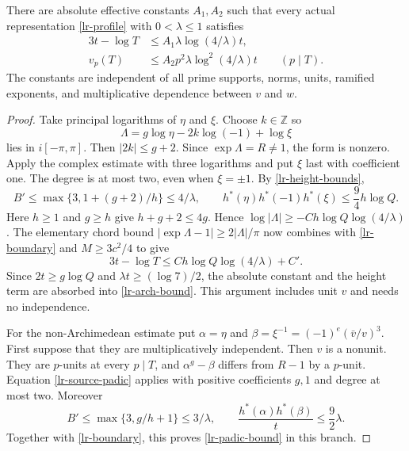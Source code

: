 \begin{theorem}\label{lr-two-place}
There are absolute effective constants $A_1,A_2$ such that every actual
representation \eqref{lr-profile} with $0<\lambda\le1$ satisfies
\begin{align}
 3t-\log T&\le A_1\lambda\log(4/\lambda)t,
      \label{lr-arch-bound}\\
 v_p(T)&\le A_2p^2\lambda\log^2(4/\lambda)t
      \qquad(p\mid T).\label{lr-padic-bound}
\end{align}
The constants are independent of all prime supports, norms, units,
ramified exponents, and multiplicative dependence between $v$ and $w$.
\end{theorem}
\begin{proof}
Take principal logarithms of $\eta$ and $\xi$. Choose $k\in\mathbb Z$ so
\[
 \Lambda=g\log\eta-2k\log(-1)+\log\xi
\]
lies in $i[-\pi,\pi]$. Then $|2k|\le g+2$. Since $\exp\Lambda=R\ne1$,
the form is nonzero. Apply the complex estimate with three logarithms and
put $\xi$ last with coefficient one. The degree is at most two, even when
$\xi=\pm1$. By \eqref{lr-height-bounds},
\[
 B'\le\max\{3,1+(g+2)/h\}\le4/\lambda,\qquad
 h^*(\eta)h^*(-1)h^*(\xi)\le\frac94h\log Q.
\]
Here $h\ge1$ and $g\ge h$ give $h+g+2\le4g$. Hence
$\log|\Lambda|\ge-C h\log Q\log(4/\lambda)$.
The elementary chord bound
$|\exp\Lambda-1|\ge2|\Lambda|/\pi$ now combines with
\eqref{lr-boundary} and $M\ge3c^2/4$ to give
\[
 3t-\log T\le C h\log Q\log(4/\lambda)+C'.
\]
Since $2t\ge g\log Q$ and $\lambda t\ge(\log7)/2$, the absolute
constant and the height term are absorbed into \eqref{lr-arch-bound}.
This argument includes unit $v$ and needs no independence.

For the non-Archimedean estimate put
$\alpha=\eta$ and $\beta=\xi^{-1}=(-1)^e(\bar v/v)^3$.
First suppose that they are multiplicatively independent. Then $v$ is a
nonunit. They are $p$-units at every $p\mid T$, and
$\alpha^g-\beta$ differs from $R-1$ by a $p$-unit. Equation
\eqref{lr-source-padic} applies with positive coefficients $g,1$ and
degree at most two. Moreover
\[
 B'\le\max\{3,g/h+1\}\le3/\lambda,\qquad
 \frac{h^*(\alpha)h^*(\beta)}t\le\frac92\lambda.
\]
Together with \eqref{lr-boundary}, this proves \eqref{lr-padic-bound}
in this branch.


\end{proof}
